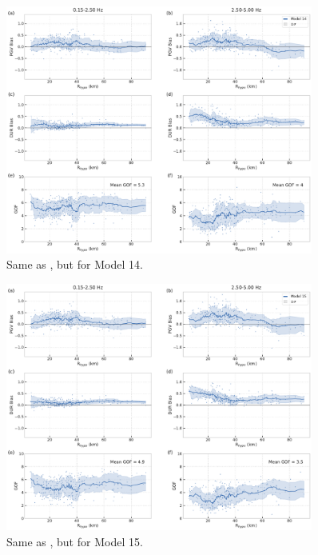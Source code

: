 \begin{figure}[!ht]
  \centering
  \includegraphics[width=0.9\textwidth,height=0.9\textheight,keepaspectratio]{figures/figure_highf_S24.pdf}
  \caption{Same as , but for Model 14.
  }
\label{fig:highf-A24}
\end{figure}
\clearpage


\begin{figure}[!ht]
  \centering
  \includegraphics[width=0.9\textwidth,height=0.9\textheight,keepaspectratio]{figures/figure_highf_S25.pdf}
  \caption{Same as , but for Model 15.
  }
\label{fig:highf-A25}
\end{figure}
\clearpage


